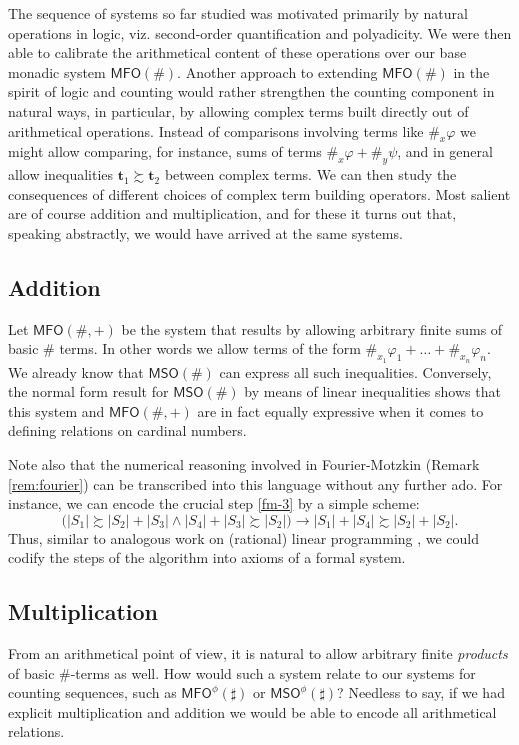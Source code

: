 \documentclass[12pt,oneside,reqno]{amsart}
\theoremstyle{definition}
\begin{document}
The sequence of systems so far studied was motivated primarily by natural operations in logic, viz. second-order quantification and polyadicity. We were then able to calibrate the arithmetical content of these operations over our base monadic system $\mathsf{MFO}(\#)$. Another approach to extending $\mathsf{MFO}(\#)$ in the spirit of logic and counting would rather strengthen the counting component in natural ways, in particular, by   allowing complex terms built directly out of arithmetical operations. Instead of comparisons involving terms like $\#_x\varphi$ we might allow comparing, for instance, sums of terms $\#_x\varphi + \#_y\psi$, and in general allow inequalities $\mathbf{t}_1 \succsim \mathbf{t}_2$ between complex terms. We can then study the consequences of different choices of complex term building operators. Most salient are of course addition and multiplication, and for these it turns out that, speaking abstractly, we would have arrived at the same systems. 

\subsection{Addition}

Let $\mathsf{MFO}(\#,+)$ be the system that results by allowing arbitrary finite sums of basic $\#$ terms. In other words we allow terms of the form $\#_{x_1}\varphi_1 + \dots + \#_{x_n}\varphi_n$. We already know that $\mathsf{MSO}(\#)$ can express all such inequalities. Conversely, the normal form result for $\mathsf{MSO}(\#)$ by means of linear inequalities shows that this system and  $\mathsf{MFO}(\#,+)$ are in fact equally expressive when it comes to defining relations on cardinal numbers.

Note also that the numerical reasoning involved in Fourier-Motzkin  (Remark \ref{rem:fourier}) can be transcribed into this language without any further ado. For instance, we can encode the crucial step \ref{fm-3} by a simple scheme: $$\big(|S_1| \succsim |S_2| + |S_3| \wedge |S_4|+|S_3| \succsim |S_2|\big) \rightarrow |S_1|+|S_4| \succsim |S_2|+|S_2|.$$ Thus, similar to analogous work on (rational) linear programming \citep{Fagin}, we could codify the steps of the algorithm into axioms of a formal system.  

\subsection{Multiplication}

From an arithmetical point of view, it is natural to allow arbitrary finite \emph{products} of basic $\#$-terms as well. How would such a system relate to our systems for counting sequences, such as $\mathsf{MFO}^\phi(\sharp)$ or $\mathsf{MSO}^\phi(\sharp)$? Needless to say, if we had explicit multiplication and addition we would be able to encode all arithmetical relations. %
\end{document}
